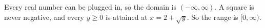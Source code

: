 Every real number can be plugged in, so the domain is $\boxed{(-\infty,\infty)}$. A square is never negative, and every $y\ge0$ is attained at $x=2+\sqrt y$. So the range is $\boxed{[0,\infty)}$.
